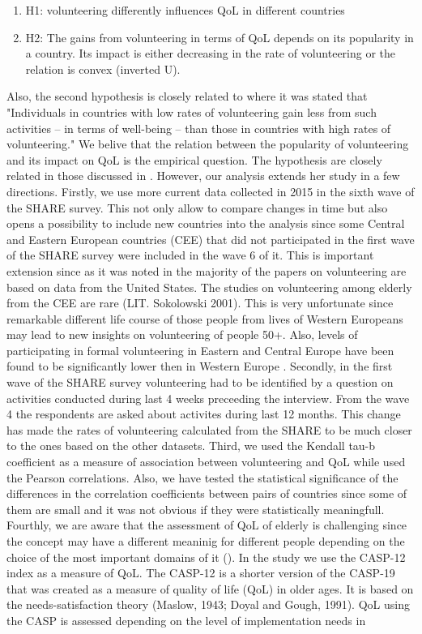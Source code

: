 \documentclass[10pt, letterpaper]{article}
\begin{document}
\begin{spacing}{1.4}
\begin{enumerate}
\item H1: volunteering  differently influences QoL in different countries
\item H2: The gains from volunteering in terms of QoL depends on its popularity in a country. Its impact is either decreasing in the rate of volunteering or the relation is convex (inverted U).
\end{enumerate}

Also, the second hypothesis is closely related to \citet{plagnol10} where it was stated that "Individuals in countries with low rates of volunteering gain less from such activities – in terms of well-being – than those in countries with high rates of volunteering." We belive that the relation between the popularity of volunteering and its impact on QoL is the empirical question. The hypothesis are closely related in those discussed in \citet{haski09}. However, our analysis extends her study in a few directions. Firstly, we use more current data collected in 2015 in the sixth wave of the SHARE survey. This not only allow to compare changes in time but also opens a possibility to include new countries into the analysis since some Central and Eastern European countries (CEE) that did not participated in the first wave of the SHARE survey were included in the wave 6 of it. This is important extension since as it was noted in \citep{casiday08} the majority of the papers on volunteering are based on data from the United States. The studies on volunteering among elderly from the CEE are rare (LIT. Sokolowski 2001). This is very unfortunate since remarkable different life course of those people from lives of Western Europeans may lead to new insights on volunteering of people 50+. Also, levels of participating in formal volunteering in Eastern and Central Europe have been found to be significantly lower then in Western Europe \citet{plagnol10}. Secondly, in the first wave of the SHARE survey volunteering had to be identified by a question on activities conducted during last 4 weeks preceeding the interview. From the wave 4 the respondents are asked about activites during last 12 months. This change has made the rates of volunteering calculated from the SHARE to be much closer to the ones based on the other datasets. Third, we used the Kendall tau-b coefficient as a measure of association between volunteering and QoL while \citet{haski09} used the Pearson correlations. Also, we have tested the statistical significance of the differences in the correlation coefficients between pairs of countries since some of them are small and it was not obvious if they were statistically meaningfull. Fourthly, we are aware that the assessment of QoL of elderly is challenging since the concept may have a different meaninig for different people depending on the choice of the most important domains of it (\citet{nrc2001}). In the study we use the CASP-12 index as a measure of QoL. The CASP-12 is a shorter version of the CASP-19 that was created as a measure of quality of life (QoL) in older ages. It is based on the needs-satisfaction theory (Maslow, 1943; Doyal and Gough, 1991). QoL using the CASP is assessed depending on the level of implementation needs in 
\end{spacing}
\end{document}
